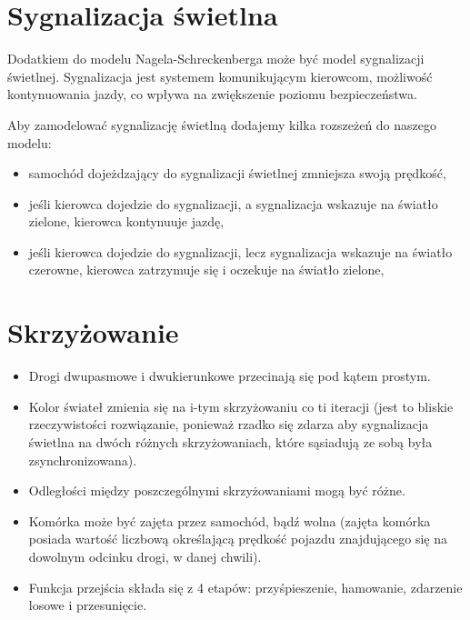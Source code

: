 \documentclass{sprawozdanie-agh}
\begin{document}
		\section{Sygnalizacja świetlna}

		Dodatkiem do modelu Nagela-Schreckenberga może być model sygnalizacji świetlnej. Sygnalizacja jest systemem komunikującym kierowcom, możliwość kontynuowania jazdy, co wpływa na zwiększenie poziomu bezpieczeństwa.

		Aby zamodelować sygnalizację świetlną dodajemy kilka rozszeżeń do naszego modelu:
		\begin{itemize}
			\item samochód dojeżdzający do sygnalizacji świetlnej zmniejsza swoją prędkość,
			\item jeśli kierowca dojedzie do sygnalizacji, a sygnalizacja wskazuje na światło zielone, kierowca kontynuuje jazdę,
			\item jeśli kierowca dojedzie do sygnalizacji, lecz sygnalizacja wskazuje na światło czerowne, kierowca zatrzymuje się i oczekuje na światło zielone,
		\end{itemize}

		\section{Skrzyżowanie}

		\begin{itemize}
			\item Drogi dwupasmowe i dwukierunkowe przecinają się pod kątem prostym.
			\item Kolor świateł zmienia się na i-tym skrzyżowaniu co ti iteracji (jest to bliskie rzeczywistości rozwiązanie, ponieważ rzadko się zdarza aby sygnalizacja świetlna na dwóch różnych skrzyżowaniach, które sąsiadują ze sobą była zsynchronizowana).
			\item Odległości między poszczególnymi skrzyżowaniami mogą być różne.
			\item Komórka może być zajęta przez samochód, bądź wolna (zajęta komórka posiada wartość liczbową określającą prędkość pojazdu znajdującego się na dowolnym odcinku drogi, w danej chwili).
			\item Funkcja przejścia składa się z 4 etapów: przyśpieszenie, hamowanie, zdarzenie losowe i przesunięcie.
		\end{itemize}
\end{document}
